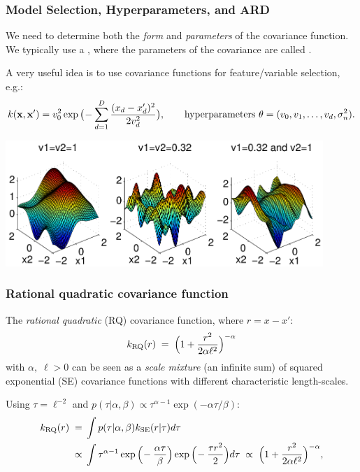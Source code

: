 \begin{frame}
\frametitle{Model Selection, Hyperparameters, and ARD}

We need to determine both the \emph{form} and \emph{parameters} of
the covariance function. 
We typically use a , where the parameters of
the covariance are called . 

A very useful
idea  is to use  covariance
functions for feature/variable selection, e.g.:
\[
k({\bf x},{\bf x}') = v_0^2\exp\big(\!-\sum_{d=1}^D\frac{(x_d-x_d')^2}{2v_d^2}
\big),\text{\ \ \ \ \ \ hyperparameters\ }
\theta=(v_0,v_1,\ldots,v_d,\sigma^2_n).
\]
\centerline{\includegraphics[width=0.9\textwidth]{ardprior}}
\end{frame}

\begin{frame}
\frametitle{Rational quadratic covariance function}

The \emph{rational quadratic} (RQ) covariance function, where $r=x-x'$:
%
\[
k_{\rm RQ}(r)\;=\;\Big(1+\frac{r^2}{2\alpha\ell^2}\Big)^{-\alpha}
\label{e:covRQ}
\]
%
with $\alpha, \; \ell > 0$ can be seen as a \emph{scale mixture} (an infinite
sum) of squared exponential (SE) covariance functions with different
characteristic length-scales.

Using $\tau=\ell^{-2}$ and
$p(\tau|\alpha,\beta)\propto\tau^{\alpha-1}\exp(-\alpha\tau/\beta)$:
\[
\begin{split}
k_{\rm RQ}(r)\;=\;&\int p(\tau|\alpha,\beta)k_{\rm SE}(r|\tau)d\tau\\
\propto\;&\int\tau^{\alpha-1}\exp\Big(\!-\frac{\alpha\tau}{\beta}\Big)
\exp\Big(\!-\frac{\tau r^2}{2}\Big)d\tau\;\propto\;
\Big(1+\frac{r^2}{2 \alpha \ell^2}\Big)^{-\alpha},
\end{split}
\label{e:rq}
\]
\end{frame}

